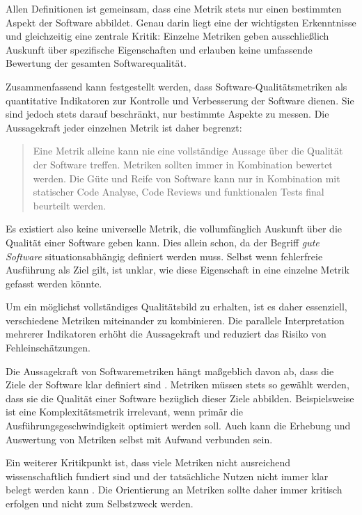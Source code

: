 Allen Definitionen ist gemeinsam, dass eine Metrik stets nur einen bestimmten Aspekt der Software abbildet. Genau darin liegt eine der wichtigsten Erkenntnisse und gleichzeitig eine zentrale Kritik: Einzelne Metriken geben ausschließlich Auskunft über spezifische Eigenschaften und erlauben keine umfassende Bewertung der gesamten Softwarequalität.

Zusammenfassend kann festgestellt werden, dass Software-Qualitätsmetriken als quantitative Indikatoren zur Kontrolle und Verbesserung der Software dienen. Sie sind jedoch stets darauf beschränkt, nur bestimmte Aspekte zu messen. Die Aussagekraft jeder einzelnen Metrik ist daher begrenzt:

\begin{quote}
    Eine Metrik alleine kann nie eine vollständige Aussage über die Qualität der Software treffen. Metriken sollten immer in Kombination bewertet werden. Die Güte und Reife von Software kann nur in Kombination mit statischer Code Analyse, Code Reviews und funktionalen Tests final beurteilt werden.\cite{schmitz_2019}
\end{quote}

Es existiert also keine universelle Metrik, die vollumfänglich Auskunft über die Qualität einer Software geben kann. Dies allein schon, da der Begriff \textit{gute Software} situationsabhängig definiert werden muss. Selbst wenn fehlerfreie Ausführung als Ziel gilt, ist unklar, wie diese Eigenschaft in eine einzelne Metrik gefasst werden könnte.

Um ein möglichst vollständiges Qualitätsbild zu erhalten, ist es daher essenziell, verschiedene Metriken miteinander zu kombinieren. Die parallele Interpretation mehrerer Indikatoren erhöht die Aussagekraft und reduziert das Risiko von Fehleinschätzungen.

\smallskip


Die Aussagekraft von Softwaremetriken hängt maßgeblich davon ab, dass die Ziele der Software klar definiert sind \cite{hall1994implementing}. Metriken müssen stets so gewählt werden, dass sie die Qualität einer Software bezüglich dieser Ziele abbilden. Beispielsweise ist eine Komplexitätsmetrik irrelevant, wenn primär die Ausführungsgeschwindigkeit optimiert werden soll. Auch kann die Erhebung und Auswertung von Metriken selbst mit Aufwand verbunden sein.

Ein weiterer Kritikpunkt ist, dass viele Metriken nicht ausreichend wissenschaftlich fundiert sind und der tatsächliche Nutzen nicht immer klar belegt werden kann \cite{voas_kuhn_2017}. Die Orientierung an Metriken sollte daher immer kritisch erfolgen und nicht zum Selbstzweck werden.

